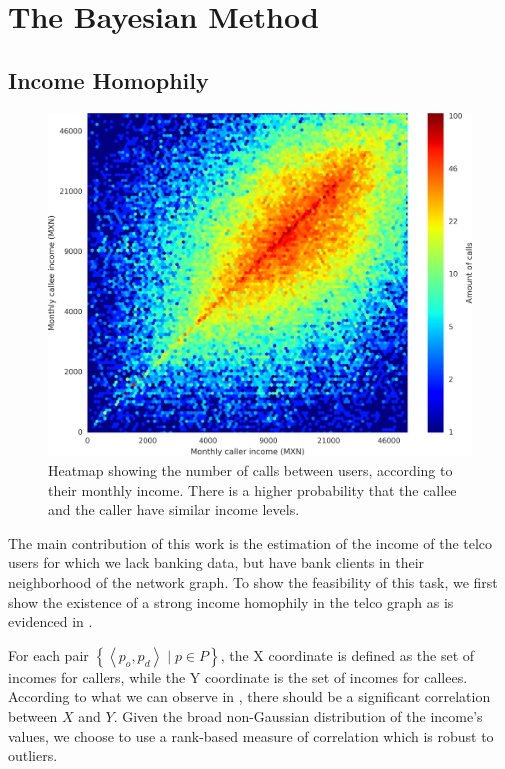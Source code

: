 \section{The Bayesian Method}
\label{inference_methodology}

\subsection{Income Homophily}

\begin{figure}
\centering
\includegraphics[width=\columnwidth]{figures/Homophily_income_origin_target_1/Homophily_income_origin_target_1.png}
\caption{Heatmap showing the number of calls between users, according to their monthly income. There is a higher probability that the callee and the caller have similar income levels.}
\label{fig:homophily_heatmap}
\end{figure}

The main contribution of this work is the estimation of the income of the telco users for which we lack banking data, but have bank clients in their neighborhood of the network graph. To show the feasibility of this task, we first show the existence of a strong income homophily in the telco graph as is evidenced in .

For each pair $\left\{ \left< p_o, p_d \right> \mid p \in P \right\}$, the X coordinate is defined as the set of incomes for callers, while the Y coordinate is the set of incomes for callees. According to what we can observe in , there should be a significant correlation between $X$ and $Y$. Given the broad non-Gaussian distribution of the income's values, we choose to use a rank-based measure of correlation which is robust to outliers.

